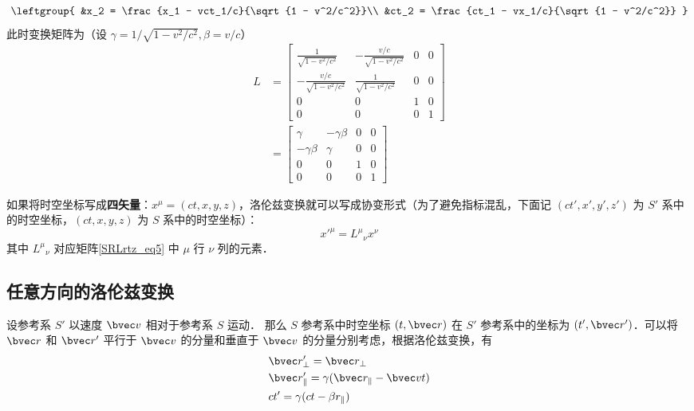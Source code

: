 \begin{equation}
\leftgroup{
&x_2 = \frac{x_1 - vct_1/c}{\sqrt{1 - v^2/c^2}}\\
&ct_2 = \frac{ct_1 - vx_1/c}{\sqrt{1 - v^2/c^2}}
}
\end{equation}
此时变换矩阵为（设 $\gamma=1/\sqrt{1-v^2/c^2},\beta=v/c$）
\begin{equation}\label{SRLrtz_eq5}
\begin{aligned}
L&=
\left[\begin{matrix}
\frac{1}{\sqrt{1-v^2/c^2}}& -\frac{v/c}{\sqrt{1-v^2/c^2}}& 0& 0\\
-\frac{v/c}{\sqrt{1-v^2/c^2}}& \frac{1}{\sqrt{1-v^2/c^2}}& 0& 0\\
0&0&1&0\\
0&0&0&1
\end{matrix}\right]\\
&=
\left[\begin{matrix}
\gamma& -\gamma\beta& 0& 0\\
-\gamma\beta& \gamma& 0& 0\\
0&0&1&0\\
0&0&0&1
\end{matrix}\right]
\end{aligned}
\end{equation}

如果将时空坐标写成\textbf{四矢量}：$x^{\mu}=(ct,x,y,z)$，洛伦兹变换就可以写成协变形式（为了避免指标混乱，下面记 $(ct',x',y',z')$ 为 $S'$ 系中的时空坐标，$(ct,x,y,z)$ 为 $S$ 系中的时空坐标）：
\begin{equation}
x'^{\mu}={L^\mu}_\nu x^\nu
\end{equation}
其中 ${L^\mu}_\nu$ 对应矩阵\autoref{SRLrtz_eq5} 中 $\mu$ 行 $\nu$ 列的元素．
\subsection{任意方向的洛伦兹变换}
设参考系 $S'$ 以速度 $\bvec v$ 相对于参考系 $S$ 运动．
那么 $S$ 参考系中时空坐标 $(t,\bvec r)$ 在 $S'$ 参考系中的坐标为 $(t',\bvec r')$．可以将 $\bvec r$ 和 $\bvec r'$ 平行于 $\bvec v$ 的分量和垂直于 $\bvec v$ 的分量分别考虑，根据洛伦兹变换，有
\begin{equation}
\begin{aligned}
&\bvec r'_{\perp}=\bvec r_{\perp}\\
&\bvec r'_{\parallel}=\gamma(\bvec r_{\parallel}-\bvec v t)\\
&ct'=\gamma(ct-\beta r_{\parallel})
\end{aligned}
\end{equation}

